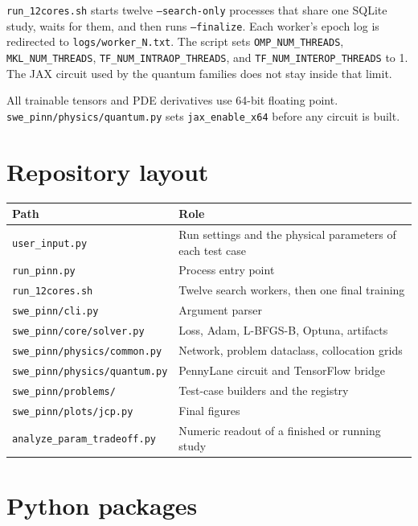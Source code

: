\documentclass[11pt]{article}
\begin{document}
\texttt{run\_12cores.sh} starts twelve \texttt{--search-only} processes that share one SQLite study, waits for them, and then runs \texttt{--finalize}.
Each worker's epoch log is redirected to \texttt{logs/worker\_N.txt}.
The script sets \texttt{OMP\_NUM\_THREADS}, \texttt{MKL\_NUM\_THREADS}, \texttt{TF\_NUM\_INTRAOP\_THREADS}, and \texttt{TF\_NUM\_INTEROP\_THREADS} to 1.
The JAX circuit used by the quantum families does not stay inside that limit.

All trainable tensors and PDE derivatives use 64-bit floating point.
\texttt{swe\_pinn/physics/quantum.py} sets \texttt{jax\_enable\_x64} before any circuit is built.

\section{Repository layout}

\begin{center}
\begin{tabular}{@{}ll@{}}
\toprule
Path & Role \\
\midrule
\texttt{user\_input.py} & Run settings and the physical parameters of each test case \\
\texttt{run\_pinn.py} & Process entry point \\
\texttt{run\_12cores.sh} & Twelve search workers, then one final training \\
\texttt{swe\_pinn/cli.py} & Argument parser \\
\texttt{swe\_pinn/core/solver.py} & Loss, Adam, L-BFGS-B, Optuna, artifacts \\
\texttt{swe\_pinn/physics/common.py} & Network, problem dataclass, collocation grids \\
\texttt{swe\_pinn/physics/quantum.py} & PennyLane circuit and TensorFlow bridge \\
\texttt{swe\_pinn/problems/} & Test-case builders and the registry \\
\texttt{swe\_pinn/plots/jcp.py} & Final figures \\
\texttt{analyze\_param\_tradeoff.py} & Numeric readout of a finished or running study \\
\bottomrule
\end{tabular}
\end{center}

\section{Python packages}
\end{document}
